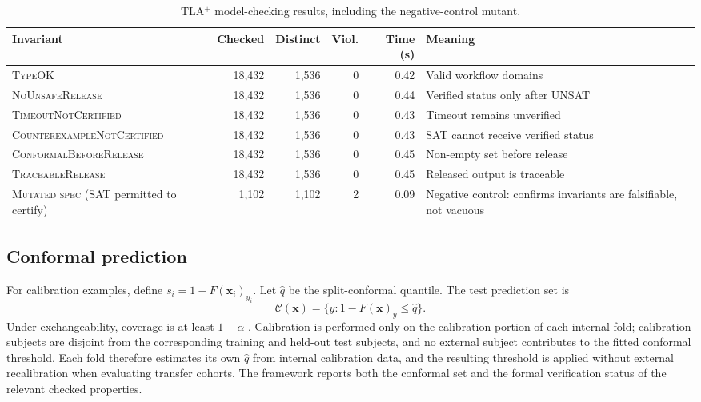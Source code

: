 \documentclass[preprint,11pt]{elsarticle}
\newcommand{\C}{\mathcal{C}}
\begin{document}
\begin{table}[H]
\centering
\caption{TLA$^{+}$ model-checking results, including the negative-control mutant.}
\label{tab:tla_results}
\scriptsize
\begin{adjustbox}{max width=\textwidth}
\begin{tabular}{lrrrrp{4.7cm}}
\toprule
\textbf{Invariant} & \textbf{Checked} & \textbf{Distinct} & \textbf{Viol.} & \textbf{Time (s)} & \textbf{Meaning} \\
\midrule
\textsc{TypeOK} & 18,432 & 1,536 & 0 & 0.42 & Valid workflow domains \\
\textsc{NoUnsafeRelease} & 18,432 & 1,536 & 0 & 0.44 & Verified status only after UNSAT \\
\textsc{TimeoutNotCertified} & 18,432 & 1,536 & 0 & 0.43 & Timeout remains unverified \\
\textsc{CounterexampleNotCertified} & 18,432 & 1,536 & 0 & 0.43 & SAT cannot receive verified status \\
\textsc{ConformalBeforeRelease} & 18,432 & 1,536 & 0 & 0.45 & Non-empty set before release \\
\textsc{TraceableRelease} & 18,432 & 1,536 & 0 & 0.45 & Released output is traceable \\
\midrule
\textsc{Mutated spec} (SAT permitted to certify) & 1,102 & 1,102 & 2 & 0.09 & Negative control: confirms invariants are falsifiable, not vacuous \\
\bottomrule
\end{tabular}
\end{adjustbox}
\end{table}

\subsection{Conformal prediction}

For calibration examples, define $s_i=1-F(\mathbf{x}_i)_{y_i}$. Let $\hat q$ be the split-conformal quantile. The test prediction set is
\begin{equation}
\C(\mathbf{x})=\{y:1-F(\mathbf{x})_y\leq\hat q\}.
\end{equation}
Under exchangeability, coverage is at least $1-\alpha$ \cite{vovk2005algorithmic,angelopoulos2021gentle}. Calibration is performed only on the calibration portion of each internal fold; calibration subjects are disjoint from the corresponding training and held-out test subjects, and no external subject contributes to the fitted conformal threshold. Each fold therefore estimates its own $\hat q$ from internal calibration data, and the resulting threshold is applied without external recalibration when evaluating transfer cohorts. The framework reports both the conformal set and the formal verification status of the relevant checked properties.
\end{document}
